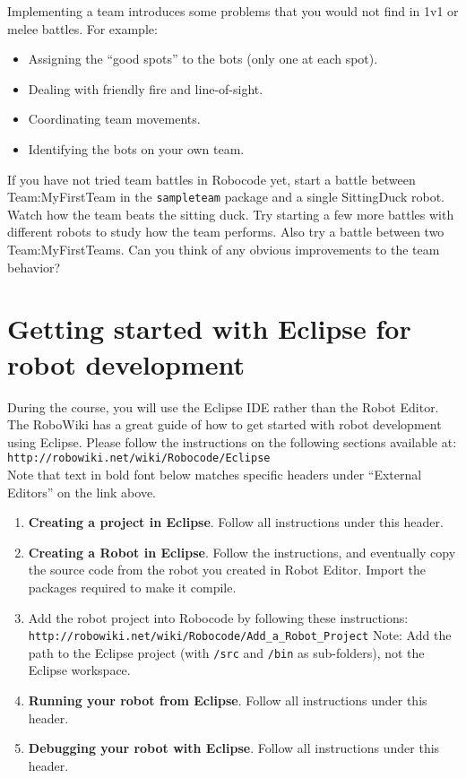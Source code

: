 \documentclass{scrreprt}
\begin{document}
Implementing a team introduces some problems that you would not find in 1v1 or melee battles. For example:

\begin{itemize}
\item Assigning the ``good spots'' to the bots (only one at each spot).
\item Dealing with friendly fire and line-of-sight.
\item Coordinating team movements.
\item Identifying the bots on your own team. 
\end{itemize}

If you have not tried team battles in Robocode yet, start a battle between Team:MyFirstTeam in the \texttt{sampleteam} package and a single SittingDuck robot. Watch how the team beats the sitting duck. Try starting a few more battles with different robots to study how the team performs. Also try a battle between two Team:MyFirstTeams. Can you think of any obvious improvements to the team behavior?

\newpage

\section{Getting started with Eclipse for robot development} \label{sec:eclipse}
During the course, you will use the Eclipse IDE rather than the Robot Editor. The RoboWiki has a great guide of how to get started with robot development using Eclipse. Please follow the instructions on the following sections available at:\\\texttt{http://robowiki.net/wiki/Robocode/Eclipse}
\\
Note that text in bold font below matches specific headers under ``External Editors'' on the link above.

\begin{enumerate}
\item \textbf{Creating a project in Eclipse}. Follow all instructions under this header.
\item \textbf{Creating a Robot in Eclipse}. Follow the instructions, and eventually copy the source code from the robot you created in Robot Editor. Import the packages required to make it compile.
\item Add the robot project into Robocode by following these instructions:\\\texttt{http://robowiki.net/wiki/Robocode/Add\_a\_Robot\_Project} Note: Add the path to the Eclipse project (with \texttt{/src} and \texttt{/bin} as sub-folders), not the Eclipse workspace.
\item \textbf{Running your robot from Eclipse}. Follow all instructions under this header.
\item \textbf{Debugging your robot with Eclipse}. Follow all instructions under this header.
\end{enumerate}
\end{document}
